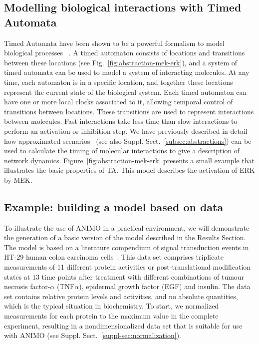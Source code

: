 \documentclass{bmcart}
\def\ta{Timed Automaton}
\def\tas{Timed Automata}
\begin{document}
\subsection*{Modelling biological interactions with Timed Automata}\label{subsec:timed-automata}
\def\ta{TA}
\def\tas{TA}

Timed Automata have been shown to be a powerful formalism to model biological processes
~\cite{ta-siebert,bartocci-oscillators,oded-ode-ta-discretization}. A timed automaton consists of locations
and transitions between these locations (see Fig.~\ref{fig:abstraction-mek-erk}), and a system of timed automata can be
used to model a system of interacting molecules. At any time, each automaton is in a specific location, and together
these locations represent the current state of the biological system. Each timed automaton can have one or more local clocks
associated to it, allowing temporal control of transitions between locations. These transitions are used to
represent interactions between molecules. Fast interactions take less time than slow interactions
to perform an activation or inhibition step. We have previously described in detail how approximated
scenarios~\cite{animo-ieee} (see also Suppl. Sect.~\ref{subsec:abstractions}) can be used to calculate the timing of molecular
interactions to give a description of network dynamics. Figure~\ref{fig:abstraction-mek-erk}
presents a small example that illustrates the basic properties of \tas.
This model describes the activation of ERK by MEK.




\subsection*{Example: building a model based on data}\label{subsec:case-study}
To illustrate the use of ANIMO in a practical environment, we will demonstrate the generation of a basic
version of the model described in the Results Section. The model is based on a literature compendium of
signal transduction events in HT-29 human colon carcinoma cells~\cite{pathway-compendium}. This data set comprises triplicate
measurements of 11 different protein activities or post-translational modification states at 13 time points after
treatment with different combinations of tumour necrosis factor-$\alpha$ (TNF$\alpha$), epidermal growth factor (EGF) and insulin.
The data set contains relative protein levels and activities, and no absolute quantities, which is the typical situation in biochemistry.
To start, we normalized measurements for each protein to the
maximum value in the complete experiment, resulting in a nondimensionalized data set that is suitable for use with ANIMO (see Suppl. Sect.~\ref{suppl-sec:normalization}).
\end{document}
